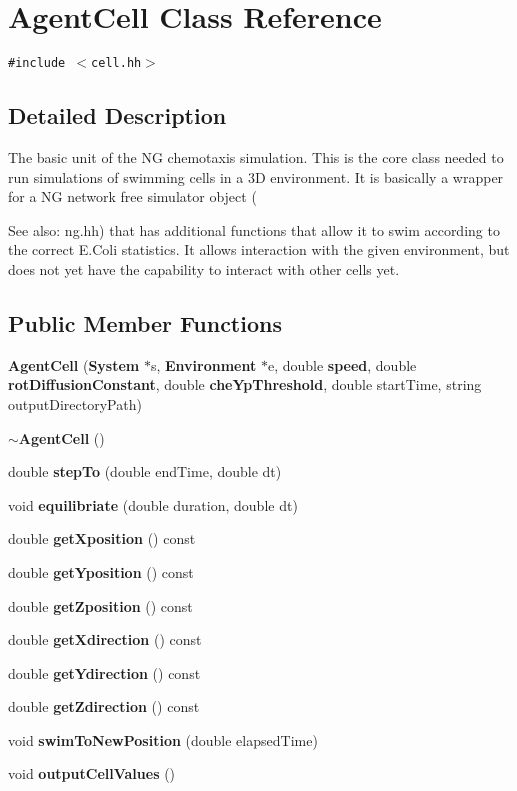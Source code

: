\section{AgentCell Class Reference}
\label{classAgentCell}
{\tt \#include $<$cell.hh$>$}



\subsection{Detailed Description}
The basic unit of the NG chemotaxis simulation. This is the core class needed to run simulations of swimming cells in a 3D environment. It is basically a wrapper for a NG network free simulator object (\begin{Desc}
\item[See also:]ng.hh) that has additional functions that allow it to swim according to the correct E.Coli statistics. It allows interaction with the given environment, but does not yet have the capability to interact with other cells yet. \end{Desc}
\subsection*{Public Member Functions}
\begin{CompactItemize}
\item 
{\bf AgentCell} ({\bf System} $\ast$s, {\bf Environment} $\ast$e, double {\bf speed}, double {\bf rotDiffusionConstant}, double {\bf cheYpThreshold}, double startTime, string outputDirectoryPath)
\item 
{\bf $\sim$AgentCell} ()
\item 
double {\bf stepTo} (double endTime, double dt)
\item 
void {\bf equilibriate} (double duration, double dt)
\item 
double {\bf getXposition} () const 
\item 
double {\bf getYposition} () const 
\item 
double {\bf getZposition} () const 
\item 
double {\bf getXdirection} () const 
\item 
double {\bf getYdirection} () const 
\item 
double {\bf getZdirection} () const 
\item 
void {\bf swimToNewPosition} (double elapsedTime)
\item 
void {\bf outputCellValues} ()
\end{CompactItemize}
